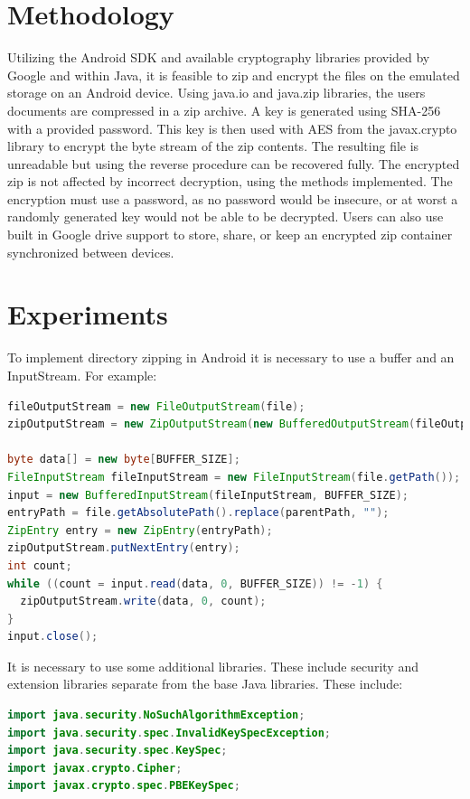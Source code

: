 \documentclass[10pt,a4paper]{article}
\begin{document}
\section{Methodology}
Utilizing the Android SDK and available cryptography libraries provided by Google and within Java, it is feasible to zip and encrypt the files on the emulated storage on an Android device. Using java.io and java.zip libraries, the users documents are compressed in a zip archive. A key is generated using SHA-256 with a provided password. This key is then used with AES from the javax.crypto library to encrypt the byte stream of the zip contents. The resulting file is unreadable but using the reverse procedure can be recovered fully. The encrypted zip is not affected by incorrect decryption, using the methods implemented. The encryption must use a password, as no password would be insecure, or at worst a randomly generated key would not be able to be decrypted. Users can also use built in Google drive support to store, share, or keep an encrypted zip container synchronized between devices.

\section{Experiments}
To implement directory zipping in Android it is necessary to use a buffer and an InputStream. For example:

\begin{lstlisting}[language=Java]
fileOutputStream = new FileOutputStream(file);
zipOutputStream = new ZipOutputStream(new BufferedOutputStream(fileOutputStream));

byte data[] = new byte[BUFFER_SIZE];
FileInputStream fileInputStream = new FileInputStream(file.getPath());
input = new BufferedInputStream(fileInputStream, BUFFER_SIZE);
entryPath = file.getAbsolutePath().replace(parentPath, "");
ZipEntry entry = new ZipEntry(entryPath);
zipOutputStream.putNextEntry(entry);
int count;
while ((count = input.read(data, 0, BUFFER_SIZE)) != -1) {
  zipOutputStream.write(data, 0, count);
}
input.close();

\end{lstlisting}

It is necessary to use some additional libraries. These include security and extension libraries separate from the base Java libraries. These include:

\begin{lstlisting}[language=Java]
import java.security.NoSuchAlgorithmException;
import java.security.spec.InvalidKeySpecException;
import java.security.spec.KeySpec;
import javax.crypto.Cipher;
import javax.crypto.spec.PBEKeySpec;
\end{lstlisting}
\end{document}
